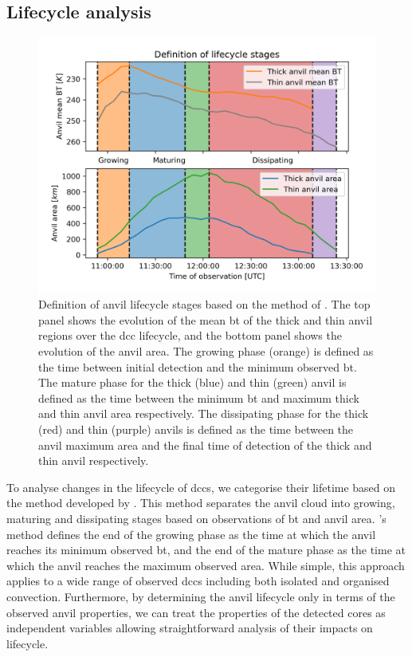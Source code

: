 \subsection{Lifecycle analysis} \label{sec:lifecycle_definition}


\begin{figure}[tp]
    \centering
    \includegraphics[width=\textwidth]{figures/chapter3_02.png}
    \caption[
    Definition of anvil lifecycle stages based on the method of \citet{futyan_deep_2007}
    ]{
    Definition of anvil lifecycle stages based on the method of \citet{futyan_deep_2007}. The top panel shows the evolution of the mean \acrshort{bt} of the thick and thin anvil regions over the \acrshort{dcc} lifecycle, and the bottom panel shows the evolution of the anvil area. The growing phase (orange) is defined as the time between initial detection and the minimum observed \acrshort{bt}. The mature phase for the thick (blue) and thin (green) anvil is defined as the time between the minimum \acrshort{bt} and maximum thick and thin anvil area respectively. The dissipating phase for the thick (red) and thin (purple) anvils is defined as the time between the anvil maximum area and the final time of detection of the thick and thin anvil respectively.
    }
    \label{fig:lifecycle_example}
\end{figure}

To analyse changes in the lifecycle of \acrshort{dcc}s, we categorise their lifetime based on the method developed by \citet{futyan_deep_2007}.
This method separates the anvil cloud into growing, maturing and dissipating stages based on observations of \acrshort{bt} and anvil area.
\citeauthor{futyan_deep_2007}'s method defines the end of the growing phase as the time at which the anvil reaches its minimum observed \acrshort{bt}, and the end of the mature phase as the time at which the anvil reaches the maximum observed area.
While simple, this approach applies to a wide range of observed \acrshort{dcc}s including both isolated and organised convection.
Furthermore, by determining the anvil lifecycle only in terms of the observed anvil properties, we can treat the properties of the detected cores as independent variables allowing straightforward analysis of their impacts on lifecycle.

